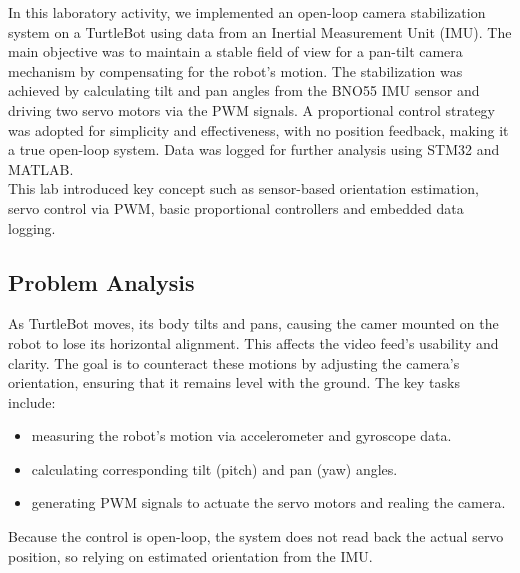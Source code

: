 
In this laboratory activity, we implemented an open-loop camera stabilization system on a TurtleBot using data from an Inertial Measurement Unit (IMU). The main objective was to maintain a stable field of view for a pan-tilt camera mechanism by compensating for the robot's motion. The stabilization was achieved by calculating tilt and pan angles from the BNO55 IMU sensor and driving two servo motors via the PWM signals. A proportional control strategy was adopted for simplicity and effectiveness, with no position feedback, making it a true open-loop system. Data was logged for further analysis using STM32 and MATLAB. \\
\noindent
This lab introduced key concept such as sensor-based orientation estimation, servo control via PWM, basic proportional controllers and embedded data logging.



\subsection{Problem Analysis}

As TurtleBot moves, its body tilts and pans, causing the camer mounted on the robot to lose its horizontal alignment. This affects the video feed's usability and clarity. The goal is to counteract these motions by adjusting the camera's orientation, ensuring that it remains level with the ground. The key tasks include: 

\begin{itemize}
    \item measuring the robot's motion via accelerometer and gyroscope data.
    \item calculating corresponding tilt (pitch) and pan (yaw) angles.
    \item generating PWM signals to actuate the servo motors and realing the camera.
\end{itemize}

Because the control is open-loop, the system does not read back the actual servo position, so relying on estimated orientation from the IMU.



